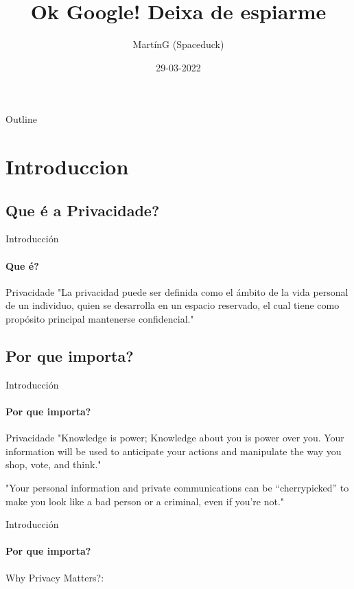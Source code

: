 \documentclass{beamer}
\title{Ok Google! Deixa de espiarme}
\author{MartínG (Spaceduck)}
\date{29-03-2022}
\begin{document}
\begin{frame}
  \titlepage
\end{frame}


\begin{frame}{Outline}
  \tableofcontents
\end{frame}


\section{Introduccion}
\subsection{Que é a Privacidade?}
\begin{frame}{Introducción}
  \framesubtitle{Que é?}
  \begin{block}{Privacidade}
    "La privacidad puede ser definida como el ámbito de la vida personal de un individuo, quien se desarrolla en un espacio reservado,
    el cual tiene como propósito principal mantenerse confidencial."
  \end{block}

\end{frame}

\subsection{Por que importa?}


\begin{frame}{Introducción}
  \framesubtitle{Por que importa?}

  \begin{block}{Privacidade}
    "Knowledge is power; Knowledge about you is power over you.
    Your information will be used to anticipate your actions
    and manipulate the way you shop, vote, and think."
  \end{block}\pause



  \begin{block}
    "Your personal information and private communications can be “cherrypicked” to make you look like
    a bad person or a criminal, even if you’re not."
  \end{block}

\end{frame}

\begin{frame}{Introducción}
  \framesubtitle{Por que importa?}

  Why Privacy Matters?:\quad
  \qquad

\end{frame}
\end{document}
